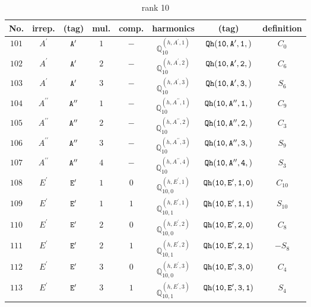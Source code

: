 \documentclass[fleqn,8pt]{jsarticle}
\begin{document}
\begin{table}[ht!]
\begin{center}
\caption{rank 10}
\renewcommand{\arraystretch}{1.3}
\begin{tabular}{cccccccc} \hline \hline
No. & irrep. & (tag) & mul. & comp. & harmonics & (tag) & definition \\ \hline
$ 101 $ & $ A^{\prime} $ & $ {\tt A'} $ & $ 1 $ & $ - $ & $ \mathbb{Q}_{10}^{(h,A^{\prime},1)} $ & $ {\tt Qh(10,A',1,)} $ & $ C_{0} $ \\
$ 102 $ & $ A^{\prime} $ & $ {\tt A'} $ & $ 2 $ & $ - $ & $ \mathbb{Q}_{10}^{(h,A^{\prime},2)} $ & $ {\tt Qh(10,A',2,)} $ & $ C_{6} $ \\
$ 103 $ & $ A^{\prime} $ & $ {\tt A'} $ & $ 3 $ & $ - $ & $ \mathbb{Q}_{10}^{(h,A^{\prime},3)} $ & $ {\tt Qh(10,A',3,)} $ & $ S_{6} $ \\
$ 104 $ & $ A^{\prime\prime} $ & $ {\tt A''} $ & $ 1 $ & $ - $ & $ \mathbb{Q}_{10}^{(h,A^{\prime\prime},1)} $ & $ {\tt Qh(10,A'',1,)} $ & $ C_{9} $ \\
$ 105 $ & $ A^{\prime\prime} $ & $ {\tt A''} $ & $ 2 $ & $ - $ & $ \mathbb{Q}_{10}^{(h,A^{\prime\prime},2)} $ & $ {\tt Qh(10,A'',2,)} $ & $ C_{3} $ \\
$ 106 $ & $ A^{\prime\prime} $ & $ {\tt A''} $ & $ 3 $ & $ - $ & $ \mathbb{Q}_{10}^{(h,A^{\prime\prime},3)} $ & $ {\tt Qh(10,A'',3,)} $ & $ S_{9} $ \\
$ 107 $ & $ A^{\prime\prime} $ & $ {\tt A''} $ & $ 4 $ & $ - $ & $ \mathbb{Q}_{10}^{(h,A^{\prime\prime},4)} $ & $ {\tt Qh(10,A'',4,)} $ & $ S_{3} $ \\
$ 108 $ & $ E^{\prime} $ & $ {\tt E'} $ & $ 1 $ & $ 0 $ & $ \mathbb{Q}_{10,0}^{(h,E^{\prime},1)} $ & $ {\tt Qh(10,E',1,0)} $ & $ C_{10} $ \\
$ 109 $ & $ E^{\prime} $ & $ {\tt E'} $ & $ 1 $ & $ 1 $ & $ \mathbb{Q}_{10,1}^{(h,E^{\prime},1)} $ & $ {\tt Qh(10,E',1,1)} $ & $ S_{10} $ \\
$ 110 $ & $ E^{\prime} $ & $ {\tt E'} $ & $ 2 $ & $ 0 $ & $ \mathbb{Q}_{10,0}^{(h,E^{\prime},2)} $ & $ {\tt Qh(10,E',2,0)} $ & $ C_{8} $ \\
$ 111 $ & $ E^{\prime} $ & $ {\tt E'} $ & $ 2 $ & $ 1 $ & $ \mathbb{Q}_{10,1}^{(h,E^{\prime},2)} $ & $ {\tt Qh(10,E',2,1)} $ & $ - S_{8} $ \\
$ 112 $ & $ E^{\prime} $ & $ {\tt E'} $ & $ 3 $ & $ 0 $ & $ \mathbb{Q}_{10,0}^{(h,E^{\prime},3)} $ & $ {\tt Qh(10,E',3,0)} $ & $ C_{4} $ \\
$ 113 $ & $ E^{\prime} $ & $ {\tt E'} $ & $ 3 $ & $ 1 $ & $ \mathbb{Q}_{10,1}^{(h,E^{\prime},3)} $ & $ {\tt Qh(10,E',3,1)} $ & $ S_{4} $ \\

\end{tabular}
\end{center}
\end{table}
\end{document}
